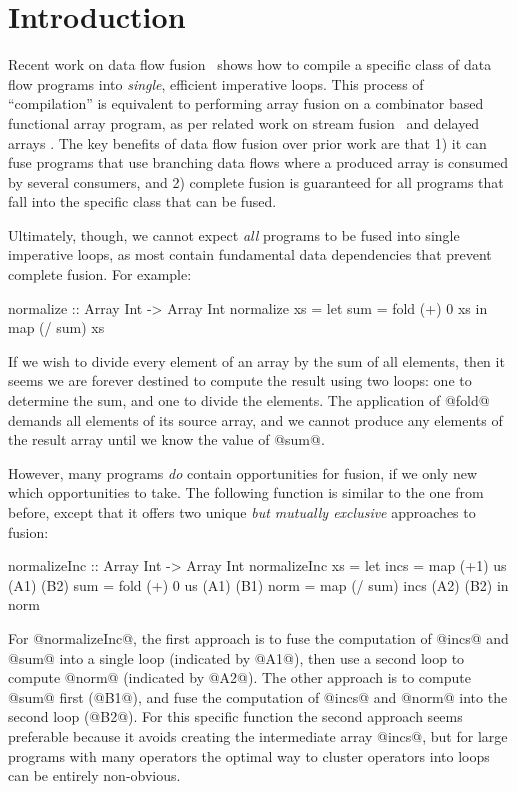 \section{Introduction}

Recent work on data flow fusion~\cite{lippmeier2013data} shows how to compile a specific class of data flow programs into \emph{single}, efficient imperative loops. This process of ``compilation'' is equivalent to performing array fusion on a combinator based functional array program, as per related work on stream fusion~\cite{coutts2007streamfusion} and delayed arrays \cite{repa}. The key benefits of data flow fusion over prior work are that 1) it can fuse programs that use branching data flows where a produced array is consumed by several consumers, and 2) complete fusion is guaranteed for all programs that fall into the specific class that can be fused. 

Ultimately, though, we cannot expect \emph{all} programs to be fused into single imperative loops, as most contain fundamental data dependencies that prevent complete fusion. For example:
\begin{code}
  normalize :: Array Int -> Array Int
  normalize xs = let sum = fold (+) 0 xs
                 in  map (/ sum) xs
\end{code}

If we wish to divide every element of an array by the sum of all elements, then it seems we are forever destined to compute the result using two loops: one to determine the sum, and one to divide the elements. The application of @fold@ demands all elements of its source array, and we cannot produce any elements of the result array until we know the value of @sum@.

However, many programs \emph{do} contain opportunities for fusion, if we only new which opportunities to take. The following function is similar to the one from before, except that it offers two unique \emph{but mutually exclusive} approaches to fusion:
\begin{code}
 normalizeInc :: Array Int -> Array Int
 normalizeInc xs
  = let incs = map  (+1)    us      (A1) (B2)
        sum  = fold (+) 0   us      (A1) (B1)
        norm = map  (/ sum) incs    (A2) (B2)
    in  norm
\end{code}

For @normalizeInc@, the first approach is to fuse the computation of @incs@ and @sum@ into a single loop (indicated by @A1@), then use a second loop to compute @norm@ (indicated by @A2@). The other approach is to compute @sum@ first (@B1@), and fuse the computation of @incs@ and @norm@ into the second loop (@B2@). For this specific function the second approach seems preferable because it avoids creating the intermediate array @incs@, but for large programs with many operators the optimal way to cluster operators into loops can be entirely non-obvious. 

